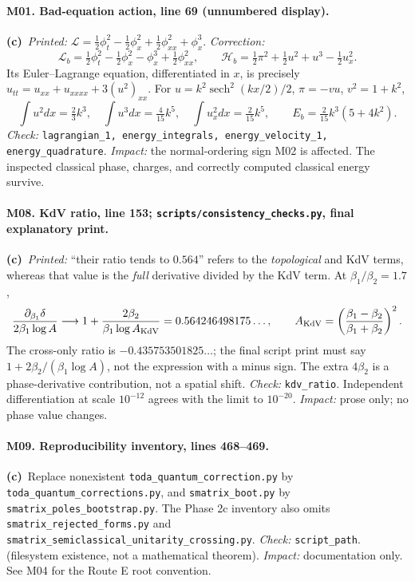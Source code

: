 \documentclass[11pt,a4paper]{article}
\newcommand{\C}{\textbf{(c)}\ }
\newcommand{\file}[1]{\nolinkurl{#1}}
\newcommand{\test}[1]{\textit{Check:} \file{#1}.}
\begin{document}
\paragraph{M01. Bad-equation action, line 69 (unnumbered display).}
\C \textit{Printed:}
$\mathcal L=\frac12\phi_t^2-\frac12\phi_x^2+\frac12\phi_{xx}^2+\phi_x^3$.
\textit{Correction:}
\[
 \mathcal L_b=\tfrac12\phi_t^2-\tfrac12\phi_x^2-\phi_x^3
                  +\tfrac12\phi_{xx}^2,\qquad
 \mathcal H_b=\tfrac12\pi^2+\tfrac12u^2+u^3-\tfrac12u_x^2.
\]
Its Euler--Lagrange equation, differentiated in $x$, is precisely
$u_{tt}=u_{xx}+u_{xxxx}+3(u^2)_{xx}$.
For $u=k^2\operatorname{sech}^2(kx/2)/2$, $\pi=-vu$, $v^2=1+k^2$,
\[
 \int u^2dx=\tfrac23k^3,\quad \int u^3dx=\tfrac4{15}k^5,\quad
 \int u_x^2dx=\tfrac2{15}k^5,\qquad E_b=\tfrac2{15}k^3(5+4k^2).
\]
\test{lagrangian_1, energy_integrals, energy_velocity_1, energy_quadrature}
\textit{Impact:} the normal-ordering sign M02 is affected. The inspected
classical phase, charges, and correctly computed classical energy survive.

\paragraph{M08. KdV ratio, line 153; \file{scripts/consistency_checks.py}, final explanatory print.}
\C \textit{Printed:} ``their ratio tends to $0.564$'' refers to the
\emph{topological} and KdV terms, whereas that value is the \emph{full}
derivative divided by the KdV term. At $\beta_1/\beta_2=1.7$,
\[
 \frac{\partial_{\beta_1}\delta}{2\beta_1\log A}\longrightarrow
 1+\frac{2\beta_2}{\beta_1\log A_{\rm KdV}}=0.564246498175\ldots,
 \qquad A_{\rm KdV}=\left(\frac{\beta_1-\beta_2}{\beta_1+\beta_2}\right)^2.
\]
The cross-only ratio is $-0.435753501825\ldots$; the final script print
must say $1+2\beta_2/(\beta_1\log A)$, not the expression with a minus sign.
The extra $4\beta_2$ is a phase-derivative contribution, not a spatial shift.
\test{kdv_ratio} Independent differentiation at scale $10^{-12}$ agrees
with the limit to $10^{-20}$. \textit{Impact:} prose only; no phase value changes.

\paragraph{M09. Reproducibility inventory, lines 468--469.}
\C Replace nonexistent \file{toda_quantum_correction.py} by
\file{toda_quantum_corrections.py}, and \file{smatrix_boot.py} by
\file{smatrix_poles_bootstrap.py}. The Phase 2c inventory also omits
\file{smatrix_rejected_forms.py} and \file{smatrix_semiclassical_unitarity_crossing.py}.
\test{script_path} (filesystem existence, not a mathematical theorem).
\textit{Impact:} documentation only. See M04 for the Route E root convention.
\end{document}
